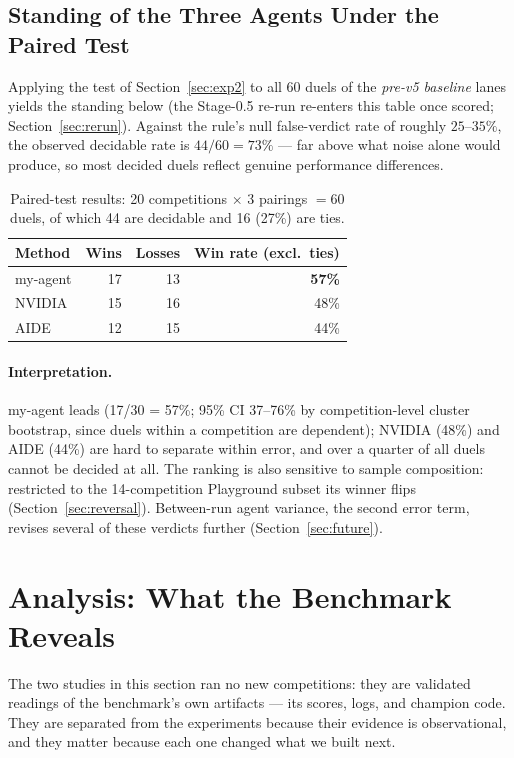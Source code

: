 \documentclass[11pt,a4paper]{article}
\begin{document}
\subsection{Standing of the Three Agents Under the Paired Test}
\label{sec:winrates}

Applying the test of Section~\ref{sec:exp2} to all 60 duels of the \emph{pre-v5 baseline} lanes yields the standing below (the Stage-0.5 re-run re-enters this table once scored; Section~\ref{sec:rerun}). Against the rule's null false-verdict rate of roughly $25$--$35\%$, the observed decidable rate is $44/60 = 73\%$ --- far above what noise alone would produce, so most decided duels reflect genuine performance differences.

\begin{table}[htbp]
\centering\small
\caption{Paired-test results: 20 competitions $\times$ 3 pairings $= 60$ duels, of which 44 are decidable and 16 (27\%) are ties.}
\label{tab:winrates}
\begin{tabular}{@{}lrrr@{}}
\toprule
\textbf{Method} & \textbf{Wins} & \textbf{Losses} & \textbf{Win rate (excl.\ ties)} \\
\midrule
my-agent & 17 & 13 & \textbf{57\%} \\
NVIDIA   & 15 & 16 & 48\% \\
AIDE     & 12 & 15 & 44\% \\
\bottomrule
\end{tabular}
\end{table}

\paragraph{Interpretation.} my-agent leads (17/30 = 57\%; 95\% CI 37--76\% by competition-level cluster bootstrap, since duels within a competition are dependent); NVIDIA (48\%) and AIDE (44\%) are hard to separate within error, and over a quarter of all duels cannot be decided at all. The ranking is also sensitive to sample composition: restricted to the 14-competition Playground subset its winner flips (Section~\ref{sec:reversal}). Between-run agent variance, the second error term, revises several of these verdicts further (Section~\ref{sec:future}).

\section{Analysis: What the Benchmark Reveals}

The two studies in this section ran no new competitions: they are validated readings of the
benchmark's own artifacts --- its scores, logs, and champion code. They are separated from the
experiments because their evidence is observational, and they matter because each one changed
what we built next.
\end{document}
